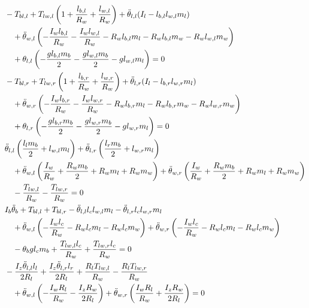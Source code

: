\begin{align}
  &-T_{bl,l}
  +T_{lw,l}\left(1+\frac{l_{b,l}}{R_w}+\frac{l_{w,l}}{R_w}\right)
  +\ddot{\theta}_{l,l}(I_l-l_{b,l}l_{w,l}m_l) \notag\\
  &\quad
  +\ddot{\theta}_{w,l}\left(
  -\frac{I_wl_{b,l}}{R_w}
  -\frac{I_wl_{w,l}}{R_w}
  -R_wl_{b,l}m_l
  -R_wl_{b,l}m_w
  -R_wl_{w,l}m_w\right) \notag\\
  &\quad
  +\theta_{l,l}\left(
  -\frac{gl_{b,l}m_b}{2}
  -\frac{gl_{w,l}m_b}{2}
  -gl_{w,l}m_l\right)=0 \\
  &-T_{bl,r}
  +T_{lw,r}\left(1+\frac{l_{b,r}}{R_w}+\frac{l_{w,r}}{R_w}\right)
  +\ddot{\theta}_{l,r}(I_l-l_{b,r}l_{w,r}m_l) \notag\\
  &\quad
  +\ddot{\theta}_{w,r}\left(
  -\frac{I_wl_{b,r}}{R_w}
  -\frac{I_wl_{w,r}}{R_w}
  -R_wl_{b,r}m_l
  -R_wl_{b,r}m_w
  -R_wl_{w,r}m_w\right) \notag\\
  &\quad
  +\theta_{l,r}\left(
  -\frac{gl_{b,r}m_b}{2}
  -\frac{gl_{w,r}m_b}{2}
  -gl_{w,r}m_l\right)=0 \\
  &\ddot{\theta}_{l,l}\left(\frac{l_lm_b}{2}+l_{w,l}m_l\right)
  +\ddot{\theta}_{l,r}\left(\frac{l_rm_b}{2}+l_{w,r}m_l\right) \notag\\
  &\quad
  +\ddot{\theta}_{w,l}\left(\frac{I_w}{R_w}+\frac{R_wm_b}{2}+R_wm_l+R_wm_w\right)
  +\ddot{\theta}_{w,r}\left(\frac{I_w}{R_w}+\frac{R_wm_b}{2}+R_wm_l+R_wm_w\right) \notag\\
  &\quad
  -\frac{T_{lw,l}}{R_w}-\frac{T_{lw,r}}{R_w}=0 \\
  &I_b\ddot{\theta}_b+T_{bl,l}+T_{bl,r}
  -\ddot{\theta}_{l,l}l_cl_{w,l}m_l
  -\ddot{\theta}_{l,r}l_cl_{w,r}m_l \notag\\
  &\quad
  +\ddot{\theta}_{w,l}\left(-\frac{I_wl_c}{R_w}-R_wl_cm_l-R_wl_cm_w\right)
  +\ddot{\theta}_{w,r}\left(-\frac{I_wl_c}{R_w}-R_wl_cm_l-R_wl_cm_w\right) \notag\\
  &\quad
  -\theta_bgl_cm_b+\frac{T_{lw,l}l_c}{R_w}+\frac{T_{lw,r}l_c}{R_w}=0 \\
  &-\frac{I_z\ddot{\theta}_{l,l}l_l}{2R_l}
  +\frac{I_z\ddot{\theta}_{l,r}l_r}{2R_l}
  +\frac{R_lT_{lw,l}}{R_w}
  -\frac{R_lT_{lw,r}}{R_w} \notag\\
  &\quad
  +\ddot{\theta}_{w,l}\left(-\frac{I_wR_l}{R_w}-\frac{I_zR_w}{2R_l}\right)
  +\ddot{\theta}_{w,r}\left(\frac{I_wR_l}{R_w}+\frac{I_zR_w}{2R_l}\right)=0
\end{align}


